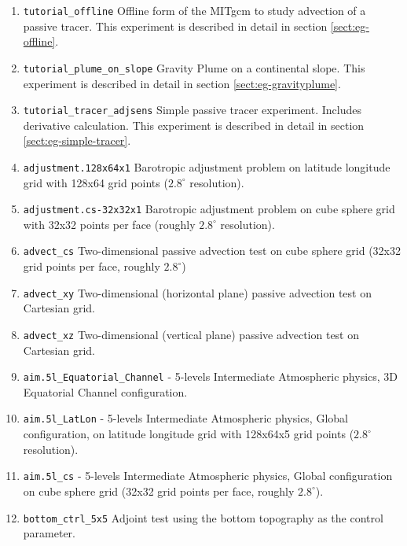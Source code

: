 \begin{enumerate}
\item \texttt{tutorial\_offline} Offline form of the MITgcm to study
  advection of a passive tracer.  This experiment is described in
  detail in section \ref{sect:eg-offline}.

\item \texttt{tutorial\_plume\_on\_slope} Gravity Plume on a
  continental slope.  This experiment is described in detail in
  section \ref{sect:eg-gravityplume}.

\item \texttt{tutorial\_tracer\_adjsens} Simple passive tracer
  experiment. Includes derivative calculation. This experiment is
  described in detail in section \ref{sect:eg-simple-tracer}.

\item \texttt{adjustment.128x64x1} Barotropic adjustment problem on
  latitude longitude grid with 128x64 grid points ($2.8^\circ$ resolution).
  
\item \texttt{adjustment.cs-32x32x1} Barotropic adjustment problem on
  cube sphere grid with 32x32 points per face (roughly $2.8^\circ$
  resolution).
  
\item \texttt{advect\_cs} Two-dimensional passive advection test on
  cube sphere grid (32x32 grid points per face, roughly $2.8^\circ$)
  
\item \texttt{advect\_xy} Two-dimensional (horizontal plane) passive
  advection test on Cartesian grid.
  
\item \texttt{advect\_xz} Two-dimensional (vertical plane) passive
  advection test on Cartesian grid.
  
\item \texttt{aim.5l\_Equatorial\_Channel}
  - 5-levels Intermediate Atmospheric physics, 
  3D Equatorial Channel configuration.
  
\item \texttt{aim.5l\_LatLon} - 5-levels Intermediate Atmospheric physics,
  Global configuration, on latitude longitude grid with 128x64x5 grid
  points ($2.8^\circ$ resolution).
  
\item \texttt{aim.5l\_cs} - 5-levels Intermediate Atmospheric physics,
  Global configuration on cube sphere grid 
  (32x32 grid points per face, roughly $2.8^\circ$). 

\item \texttt{bottom\_ctrl\_5x5} Adjoint test using the bottom
  topography as the control parameter.


\end{enumerate}
